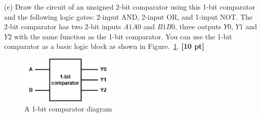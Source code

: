 \documentclass[a4paper]{article}
\begin{document}
(e) Draw the circuit of an unsigned 2-bit comparator using this 1-bit comparator and the following logic gates: 2-input AND, 2-input OR, and 1-input NOT. The 2-bit comparator has two 2-bit inputs $A1A0$ and $B1B0$, three outputs $Y0$, $Y1$ and $Y2$ with the same function as the 1-bit comparator. You can use the 1-bit comparator as a basic logic block as shown in Figure.~\ref{fig:Q1_comparator_1}. \textbf{[10 pt]}
\begin{figure}[htbp]
    \centering
    \includegraphics[width=0.4\textwidth]{Q1_comparator_1.png}
    \caption{A 1-bit comparator diagram}
    \label{fig:Q1_comparator_1}
\end{figure}
\end{document}
